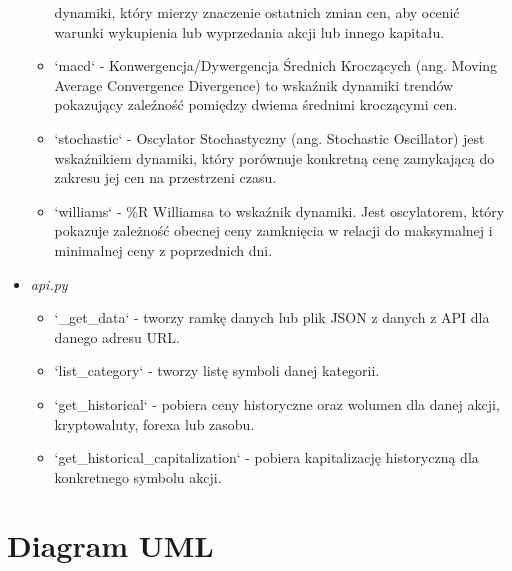 \documentclass[12pt]{article}
\begin{document}
\begin{itemize}
\begin{itemize}
			dynamiki, który mierzy znaczenie ostatnich zmian cen, aby ocenić warunki wykupienia lub wyprzedania
			akcji lub innego kapitału.
			\item `macd` - Konwergencja/Dywergencja Średnich Kroczących (ang. Moving Average Convergence Divergence)
			to wskaźnik dynamiki trendów pokazujący zaleźność pomiędzy dwiema średnimi kroczącymi cen.
			\item `stochastic` - Oscylator Stochastyczny (ang. Stochastic Oscillator) jest wskaźnikiem dynamiki,
			który porównuje konkretną cenę zamykającą do zakresu jej cen na przestrzeni czasu.
			\item `williams` - \%R Williamsa to wskaźnik dynamiki. Jest oscylatorem, który pokazuje zależność obecnej
			ceny zamknięcia w relacji do maksymalnej i minimalnej ceny z poprzednich dni.
		\end{itemize}
		\item \textit{api.py}
			\begin{itemize}
				\item `\_get\_data` - tworzy ramkę danych lub plik JSON z danych z API dla danego adresu URL.
				\item `list\_category` - tworzy listę symboli danej kategorii.
				\item `get\_historical` - pobiera ceny historyczne oraz wolumen dla danej akcji, kryptowaluty, forexa
				lub zasobu.
				\item `get\_historical\_capitalization` - pobiera kapitalizację historyczną dla konkretnego symbolu
				akcji.
			\end{itemize}
	\end{itemize}

	\section{Diagram UML}\label{sec:diagram-uml}
\end{document}
